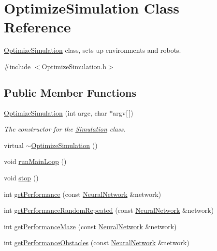 \hypertarget{classOptimizeSimulation}{\section{Optimize\-Simulation Class Reference}
\label{classOptimizeSimulation}
}


\hyperlink{classOptimizeSimulation}{Optimize\-Simulation} class, sets up environments and robots.  




{\ttfamily \#include $<$Optimize\-Simulation.\-h$>$}

\subsection*{Public Member Functions}
\begin{DoxyCompactItemize}
\item 
\hyperlink{classOptimizeSimulation_a24503060026d2f4bb2224e6ba3f554a5}{Optimize\-Simulation} (int argc, char $\ast$argv\mbox{[}$\,$\mbox{]})
\begin{DoxyCompactList}\small\item\em The constructor for the \hyperlink{classSimulation}{Simulation} class. \end{DoxyCompactList}\item 
virtual \hyperlink{classOptimizeSimulation_a4c097b55978ea713789ea1f4b97630e1}{$\sim$\-Optimize\-Simulation} ()
\item 
void \hyperlink{classOptimizeSimulation_a51f48566cb982a61daa877d213c528b0}{run\-Main\-Loop} ()
\item 
void \hyperlink{classOptimizeSimulation_a0216d870b6d411e771424be041658d36}{stop} ()
\item 
int \hyperlink{classOptimizeSimulation_af14f1d43b9c80f3a3121bd62a133ce28}{get\-Performance} (const \hyperlink{classNeuralNetwork}{Neural\-Network} \&network)
\item 
int \hyperlink{classOptimizeSimulation_ace9c1e57f259d3e69aa1fbd8d971985c}{get\-Performance\-Random\-Repeated} (const \hyperlink{classNeuralNetwork}{Neural\-Network} \&network)
\item 
int \hyperlink{classOptimizeSimulation_ab2d721222b5dc4a2831d70af136409e7}{get\-Performance\-Maze} (const \hyperlink{classNeuralNetwork}{Neural\-Network} \&network)
\item 
int \hyperlink{classOptimizeSimulation_a27f0912295edf0a54e4251bb17291bba}{get\-Performance\-Obstacles} (const \hyperlink{classNeuralNetwork}{Neural\-Network} \&network)
\end{DoxyCompactItemize}


